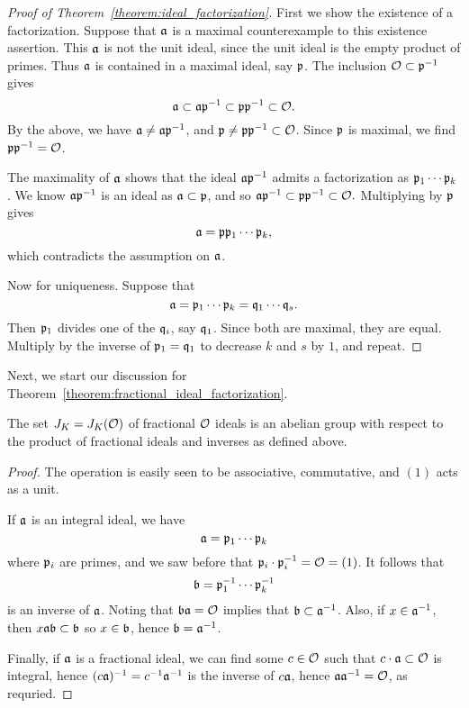 \begin{proof}[Proof of Theorem~\ref{theorem:ideal_factorization}]
  First we show the existence of a factorization.
  Suppose that $\mathfrak{a}$ is a maximal counterexample to this existence assertion.
  This $\mathfrak{a}$ is not the unit ideal, since the unit ideal is the empty product of primes.
  Thus $\mathfrak{a}$ is contained in a maximal ideal, say $\mathfrak{p}$.
  The inclusion $\mathcal{O} \subset \mathfrak{p}^{-1}$ gives
  \[ \mathfrak{a} \subset \mathfrak{a} \mathfrak{p}^{-1} \subset \mathfrak{p} \mathfrak{p}^{-1} \subset \mathcal{O}. \]
  By the above, we have $\mathfrak{a} \neq \mathfrak{a} \mathfrak{p}^{-1}$, and $\mathfrak{p} \neq \mathfrak{p} \mathfrak{p}^{-1} \subset \mathcal{O}$.
  Since $\mathfrak{p}$ is maximal, we find $\mathfrak{p} \mathfrak{p}^{-1} = \mathcal{O}$.

  The maximality of $\mathfrak{a}$ shows that the ideal $\mathfrak{a} \mathfrak{p}^{-1}$ admits a factorization as $\mathfrak{p}_{1} \cdots \mathfrak{p}_{k}$.
  We know $\mathfrak{a} \mathfrak{p}^{-1}$ is an ideal as $\mathfrak{a} \subset \mathfrak{p}$, and so $\mathfrak{a} \mathfrak{p}^{-1}\subset \mathfrak{p} \mathfrak{p}^{-1} \subset \mathcal{O}.$
  Multiplying by $\mathfrak{p}$ gives
  \[ \mathfrak{a} = \mathfrak{p} \mathfrak{p}_{1} \cdots \mathfrak{p}_{k}, \]
  which contradicts the assumption on $\mathfrak{a}$.

  Now for uniqueness.
  Suppose that
  \[ \mathfrak{a} = \mathfrak{p}_{1} \cdots \mathfrak{p}_{k} = \mathfrak{q}_{1} \cdots \mathfrak{q}_{s}. \]
  Then $\mathfrak{p}_{1}$ divides one of the $\mathfrak{q}_{i}$, say $\mathfrak{q}_{1}$.
  Since both are maximal, they are equal.
  Multiply by the inverse of $\mathfrak{p}_{1} = \mathfrak{q}_{1}$ to decrease $k$ and $s$ by $1$, and repeat.
\end{proof}

Next, we start our discussion for Theorem~\ref{theorem:fractional_ideal_factorization}.

\begin{proposition}
  The set $J_{K} = J_{K}(\mathcal{O})$ of fractional $\mathcal{O}$ ideals is an abelian group with respect to the product of fractional ideals and inverses as defined above.
\end{proposition}
\begin{proof}
  The operation is easily seen to be associative, commutative, and $(1)$ acts as a unit.

  If $\mathfrak{a}$ is an integral ideal, we have
  \[ \mathfrak{a} = \mathfrak{p}_{1} \cdots \mathfrak{p}_{k} \]
  where $\mathfrak{p}_{i}$ are primes, and we saw before that $\mathfrak{p}_{i} \cdot \mathfrak{p}_{i}^{-1} = \mathcal{O} = (1)$.
  It follows that
  \[ \mathfrak{b} = \mathfrak{p}_{1}^{-1} \cdots \mathfrak{p}_{k}^{-1} \]
  is an inverse of $\mathfrak{a}$.
  Noting that $\mathfrak{b} \mathfrak{a} = \mathcal{O}$ implies that $\mathfrak{b} \subset \mathfrak{a}^{-1}$.
  Also, if $x \in \mathfrak{a}^{-1}$, then $x \mathfrak{a} \mathfrak{b} \subset \mathfrak{b}$ so $x \in \mathfrak{b}$, hence $\mathfrak{b} = \mathfrak{a}^{-1}$.

  Finally, if $\mathfrak{a}$ is a fractional ideal, we can find some $c \in \mathcal{O}$ such that $c \cdot \mathfrak{a} \subset \mathcal{O}$ is integral, hence $(c \mathfrak{a})^{-1} = c^{-1} \mathfrak{a}^{-1}$ is the inverse of $c \mathfrak{a}$, hence $\mathfrak{a} \mathfrak{a}^{-1} = \mathcal{O}$, as requried.
\end{proof}

